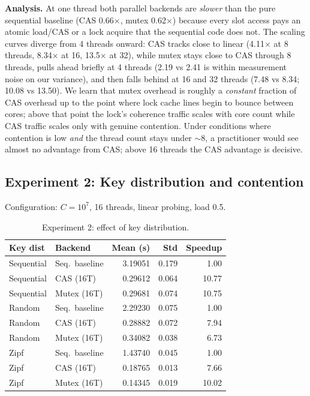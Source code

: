 \documentclass[10pt,twocolumn]{article}
\begin{document}
\textbf{Analysis.} At one thread both parallel backends are
\emph{slower} than the pure sequential baseline (CAS 0.66$\times$,
mutex 0.62$\times$) because every slot access pays an atomic
load/CAS or a lock acquire that the sequential code does not. The
scaling curves diverge from 4 threads onward: CAS tracks close to
linear (4.11$\times$ at 8 threads, 8.34$\times$ at 16, 13.5$\times$
at 32), while mutex stays close to CAS through 8 threads, pulls
ahead briefly at 4 threads (2.19 vs 2.41 is within measurement
noise on our variance), and then falls behind at 16 and 32 threads
(7.48 vs 8.34; 10.08 vs 13.50). We learn that mutex overhead is
roughly a \emph{constant} fraction of CAS overhead up to the point
where lock cache lines begin to bounce between cores; above that
point the lock's coherence traffic scales with core count while
CAS traffic scales only with genuine contention. Under conditions
where contention is low \emph{and} the thread count stays under
$\sim$8, a practitioner would see almost no advantage from CAS;
above 16 threads the CAS advantage is decisive.

\subsection{Experiment 2: Key distribution and contention}
Configuration: $C = 10^7$, 16 threads, linear probing, load 0.5.

\begin{table}[h]
\centering
\scriptsize
\begin{tabular}{llrrr}
\toprule
Key dist & Backend & Mean (s) & Std & Speedup \\
\midrule
Sequential & Seq.\ baseline & 3.19051 & 0.179 & 1.00 \\
Sequential & CAS (16T)      & 0.29612 & 0.064 & 10.77 \\
Sequential & Mutex (16T)    & 0.29681 & 0.074 & 10.75 \\
Random     & Seq.\ baseline & 2.29230 & 0.075 & 1.00 \\
Random     & CAS (16T)      & 0.28882 & 0.072 & 7.94 \\
Random     & Mutex (16T)    & 0.34082 & 0.038 & 6.73 \\
Zipf       & Seq.\ baseline & 1.43740 & 0.045 & 1.00 \\
Zipf       & CAS (16T)      & 0.18765 & 0.013 & 7.66 \\
Zipf       & Mutex (16T)    & 0.14345 & 0.019 & 10.02 \\
\bottomrule
\end{tabular}
\caption{Experiment 2: effect of key distribution.}
\label{tab:e2}
\end{table}
\end{document}
